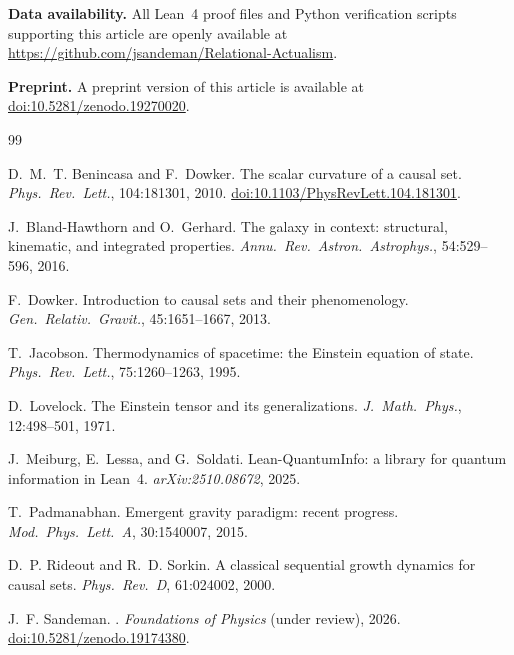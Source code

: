 \documentclass[11pt,a4paper]{article}
\begin{document}
\smallskip\noindent
\textbf{Data availability.}
All Lean~4 proof files and Python verification scripts supporting this
article are openly available at
\url{https://github.com/jsandeman/Relational-Actualism}.

\smallskip\noindent
\textbf{Preprint.}
A preprint version of this article is available at
\href{https://doi.org/10.5281/zenodo.19270020}{doi:10.5281/zenodo.19270020}.

\begin{thebibliography}{99}

D.~M.~T. Benincasa and F.~Dowker.
\newblock The scalar curvature of a causal set.
\newblock \textit{Phys.\ Rev.\ Lett.}, 104:181301, 2010.
\newblock \href{https://doi.org/10.1103/PhysRevLett.104.181301}{doi:10.1103/PhysRevLett.104.181301}.

J.~Bland-Hawthorn and O.~Gerhard.
\newblock The galaxy in context: structural, kinematic, and integrated properties.
\newblock \textit{Annu.\ Rev.\ Astron.\ Astrophys.}, 54:529--596, 2016.

F.~Dowker.
\newblock Introduction to causal sets and their phenomenology.
\newblock \textit{Gen.\ Relativ.\ Gravit.}, 45:1651--1667, 2013.

T.~Jacobson.
\newblock Thermodynamics of spacetime: the Einstein equation of state.
\newblock \textit{Phys.\ Rev.\ Lett.}, 75:1260--1263, 1995.

D.~Lovelock.
\newblock The Einstein tensor and its generalizations.
\newblock \textit{J.\ Math.\ Phys.}, 12:498--501, 1971.

J.~Meiburg, E.~Lessa, and G.~Soldati.
\newblock Lean-QuantumInfo: a library for quantum information in Lean~4.
\newblock \textit{arXiv:2510.08672}, 2025.

T.~Padmanabhan.
\newblock Emergent gravity paradigm: recent progress.
\newblock \textit{Mod.\ Phys.\ Lett.~A}, 30:1540007, 2015.

D.~P. Rideout and R.~D. Sorkin.
\newblock A classical sequential growth dynamics for causal sets.
\newblock \textit{Phys.\ Rev.~D}, 61:024002, 2000.

J.~F. Sandeman.
.
\newblock \textit{Foundations of Physics} (under review), 2026.
\newblock \href{https://doi.org/10.5281/zenodo.19174380}{doi:10.5281/zenodo.19174380}.


\end{thebibliography}
\end{document}
